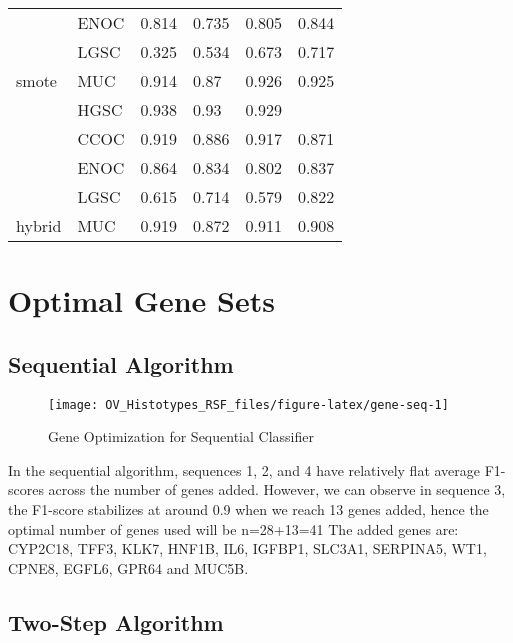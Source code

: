 \documentclass[
]{report}
\begin{document}
\begin{table}
\begin{tabular}[t]{l|l|l|l|l|l}
 & ENOC & 0.814 & 0.735 & 0.805 & 0.844\\
\cline{2-6}
 & LGSC & 0.325 & 0.534 & 0.673 & 0.717\\
\cline{2-6}
\multirow{-5}{*}{\raggedright\arraybackslash smote} & MUC & 0.914 & 0.87 & 0.926 & 0.925\\
\cline{1-6}
 & HGSC & 0.938 & 0.93 & 0.929 & \cellcolor[HTML]{90ee90}{0.941}\\
\cline{2-6}
 & CCOC & 0.919 & 0.886 & 0.917 & 0.871\\
\cline{2-6}
 & ENOC & 0.864 & 0.834 & 0.802 & 0.837\\
\cline{2-6}
 & LGSC & 0.615 & 0.714 & 0.579 & 0.822\\
\cline{2-6}
\multirow{-5}{*}{\raggedright\arraybackslash hybrid} & MUC & 0.919 & 0.872 & 0.911 & 0.908\\
\hline
\end{tabular}
\end{table}

\hypertarget{optimal-gene-sets}{%
\section{Optimal Gene Sets}\label{optimal-gene-sets}}

\hypertarget{sequential-algorithm-1}{%
\subsection{Sequential Algorithm}\label{sequential-algorithm-1}}

\begin{figure}[H]

{\centering \texttt{[image: OV\_Histotypes\_RSF\_files/figure-latex/gene-seq-1]} 

}

\caption{Gene Optimization for Sequential Classifier}\label{fig:gene-seq}
\end{figure}

In the sequential algorithm, sequences 1, 2, and 4 have relatively flat average F1-scores across the number of genes added. However, we can observe in sequence 3, the F1-score stabilizes at around 0.9 when we reach 13 genes added, hence the optimal number of genes used will be n=28+13=41 The added genes are: CYP2C18, TFF3, KLK7, HNF1B, IL6, IGFBP1, SLC3A1, SERPINA5, WT1, CPNE8, EGFL6, GPR64 and MUC5B.

\hypertarget{two-step-algorithm-1}{%
\subsection{Two-Step Algorithm}\label{two-step-algorithm-1}}
\end{document}
